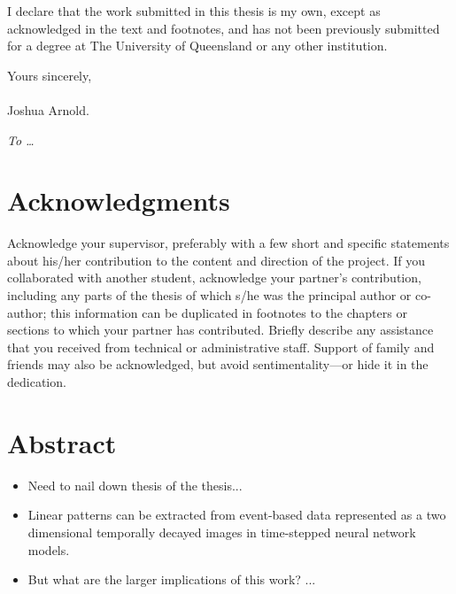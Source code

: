 \documentclass[12pt,openany,a4paper]{book}
\renewcommand{\baselinestretch}{1.2}	%
\begin{document}
I declare that the work submitted in this thesis is my own, except as
acknowledged in the text and footnotes, and has not been previously
submitted for a degree at The University of Queensland or any other
institution.

\begin{flushright}
	Yours sincerely,\\
	\medskip
	\emph{}\\
	\medskip
	Joshua Arnold.
\end{flushright}

\cleardoublepage

\vspace*{70mm}
\begin{center}
\renewcommand{\baselinestretch}{1.0}
\sl
	To \ldots
\end{center}

\chapter{Acknowledgments}

Acknowledge your supervisor, preferably with a few short and specific
statements about his/her contribution to the content and direction of
the project.  If you collaborated with another student, acknowledge
your partner's contribution, including any parts of the thesis of
which s/he was the principal author or co-author; this information can
be duplicated in footnotes to the chapters or sections to which your
partner has contributed.  Briefly describe any assistance that you
received from technical or administrative staff.  Support of family
and friends may also be acknowledged, but avoid sentimentality---or
hide it in the dedication.

\cleardoublepage

\chapter{Abstract}

\begin{itemize}
\item Need to nail down thesis of the thesis... \hfill

\item Linear patterns can be extracted from event-based data represented as a two dimensional temporally decayed images in time-stepped neural network models. \hfill

\item But what are the larger implications of this work? ...
\end{itemize}
\end{document}
